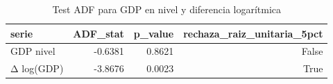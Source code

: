 \begin{table}
\caption{Test ADF para GDP en nivel y diferencia logarítmica}
\label{tab:adf_gdp}
\begin{tabular}{lrrr}
\toprule
serie & ADF_stat & p_value & rechaza_raiz_unitaria_5pct \\
\midrule
GDP nivel & -0.6381 & 0.8621 & False \\
Δ log(GDP) & -3.8676 & 0.0023 & True \\
\bottomrule
\end{tabular}
\end{table}
